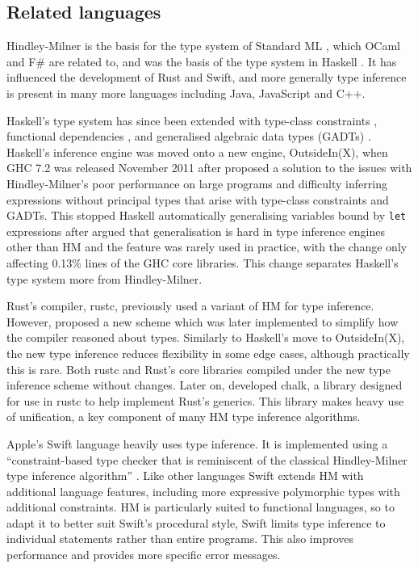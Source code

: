 \documentclass[a4paper,fleqn,oneside,12pt]{report}
\begin{document}
\subsection{Related languages}

Hindley-Milner is the basis for the type system of Standard ML \citep{ref15}, which OCaml and F\# are related to, and was the basis of the type system in Haskell \citep{ref16}. It has influenced the development of Rust and Swift, and more generally type inference is present in many more languages including Java, JavaScript and C++.

Haskell's type system has since been extended with type-class constraints \citep{ref17}, functional dependencies \citep{ref18}, and generalised algebraic data types (GADTs) \citep{ref19}. Haskell’s inference engine was moved onto a new engine, OutsideIn(X), when GHC 7.2 was released November 2011 after \cite{ref20} proposed a solution to the issues with Hindley-Milner’s poor performance on large programs and difficulty inferring expressions without principal types that arise with type-class constraints and GADTs. This stopped Haskell automatically generalising variables bound by \texttt{let} expressions after \cite{ref21} argued that generalisation is hard in type inference engines other than HM and the feature was rarely used in practice, with the change only affecting 0.13\% lines of the GHC core libraries. This change separates Haskell's type system more from Hindley-Milner.

Rust’s compiler, rustc, previously used a variant of HM for type inference. However, \cite{ref22} proposed a new scheme which was later implemented to simplify how the compiler reasoned about types. Similarly to Haskell’s move to OutsideIn(X), the new type inference reduces flexibility in some edge cases, although practically this is rare. Both rustc and Rust’s core libraries compiled under the new type inference scheme without changes. Later on, \cite{ref23} developed chalk, a library designed for use in rustc to help implement Rust’s generics. This library makes heavy use of unification, a key component of many HM type inference algorithms.

Apple's Swift language heavily uses type inference. It is implemented using a ``constraint-based type checker that is reminiscent of the classical Hindley-Milner type inference algorithm'' \citep{ref24}. Like other languages Swift extends HM with additional language features, including more expressive polymorphic types with additional constraints. HM is particularly suited to functional languages, so to adapt it to better suit Swift's procedural style, Swift limits type inference to individual statements rather than entire programs. This also improves performance and provides more specific error messages.
\end{document}
